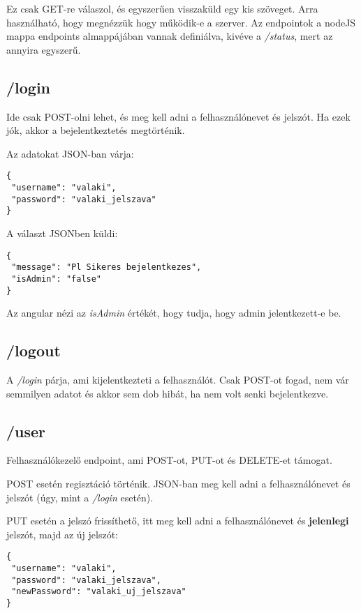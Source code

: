 \documentclass[]{article}
\begin{document}
Ez csak GET-re válaszol, és egyszerűen visszaküld egy kis szöveget. Arra használható, hogy megnézzük hogy működik-e a szerver. Az endpointok a nodeJS mappa endpoints almappájában vannak definiálva, kivéve a \textit{/status}, mert az annyira egyszerű.

\subsection{/login}

Ide csak POST-olni lehet, és meg kell adni a felhasználónevet és jelszót. Ha ezek jók, akkor a bejelentkeztetés megtörténik.

\noindent
Az adatokat JSON-ban várja:

\bigskip
\begin{lstlisting}
{
 "username": "valaki",
 "password": "valaki_jelszava"
}
\end{lstlisting}

\noindent
A választ JSONben küldi:

\bigskip
\begin{lstlisting}
{
 "message": "Pl Sikeres bejelentkezes",
 "isAdmin": "false"
}
\end{lstlisting}

\noindent
Az angular nézi az \textit{isAdmin} értékét, hogy tudja, hogy admin jelentkezett-e be.

\subsection{/logout}

A \textit{/login} párja, ami kijelentkezteti a felhasználót. Csak POST-ot fogad, nem vár semmilyen adatot és akkor sem dob hibát, ha nem volt senki bejelentkezve.

\subsection{/user}

Felhasználókezelő endpoint, ami POST-ot, PUT-ot és DELETE-et támogat.

POST esetén regisztáció történik. JSON-ban meg kell adni a felhasználónevet és jelszót (úgy, mint a \textit{/login} esetén).

PUT esetén a jelszó frissíthető, itt meg kell adni a felhasználónevet és \textbf{jelenlegi} jelszót, majd az új jelszót:

\bigskip
\begin{lstlisting}
{
 "username": "valaki",
 "password": "valaki_jelszava",
 "newPassword": "valaki_uj_jelszava"
}
\end{lstlisting}
\end{document}
